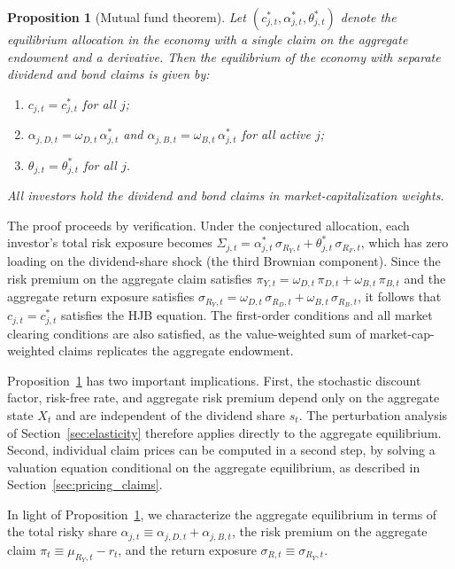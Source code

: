 \documentclass[12pt,english]{article}
\newtheorem{prop}{Proposition}
\begin{document}
\begin{prop}[Mutual fund theorem]\label{prop:mft}
Let $(c_{j,t}^*, \alpha_{j,t}^*, \theta_{j,t}^*)$ denote the equilibrium allocation in the economy with a single claim on the aggregate endowment and a derivative. Then the equilibrium of the economy with separate dividend and bond claims is given by:
\begin{enumerate}[label=(\roman*)]
    \item $c_{j,t} = c_{j,t}^*$ for all $j$;
    \item $\alpha_{j,D,t} = \omega_{D,t}\,\alpha_{j,t}^*$ and $\alpha_{j,B,t} = \omega_{B,t}\,\alpha_{j,t}^*$ for all active $j$;
    \item $\theta_{j,t} = \theta_{j,t}^*$ for all $j$.
\end{enumerate}
All investors hold the dividend and bond claims in market-capitalization weights.
\end{prop}

The proof proceeds by verification. Under the conjectured allocation, each investor's total risk exposure becomes $\Sigma_{j,t} = \alpha_{j,t}^*\,\sigma_{R_Y,t} + \theta_{j,t}^*\,\sigma_{R_F,t}$, which has zero loading on the dividend-share shock (the third Brownian component). Since the risk premium on the aggregate claim satisfies $\pi_{Y,t} = \omega_{D,t}\,\pi_{D,t} + \omega_{B,t}\,\pi_{B,t}$ and the aggregate return exposure satisfies $\sigma_{R_Y,t} = \omega_{D,t}\,\sigma_{R_D,t} + \omega_{B,t}\,\sigma_{R_B,t}$, it follows that $c_{j,t} = c_{j,t}^*$ satisfies the HJB equation. The first-order conditions and all market clearing conditions are also satisfied, as the value-weighted sum of market-cap-weighted claims replicates the aggregate endowment.

Proposition~\ref{prop:mft} has two important implications. First, the stochastic discount factor, risk-free rate, and aggregate risk premium depend only on the aggregate state $X_t$ and are independent of the dividend share $s_t$. The perturbation analysis of Section~\ref{sec:elasticity} therefore applies directly to the aggregate equilibrium. Second, individual claim prices can be computed in a second step, by solving a valuation equation conditional on the aggregate equilibrium, as described in Section~\ref{sec:pricing_claims}.

In light of Proposition~\ref{prop:mft}, we characterize the aggregate equilibrium in terms of the total risky share $\alpha_{j,t} \equiv \alpha_{j,D,t} + \alpha_{j,B,t}$, the risk premium on the aggregate claim $\pi_t \equiv \mu_{R_Y,t} - r_t$, and the return exposure $\sigma_{R,t} \equiv \sigma_{R_Y,t}$.
\end{document}
